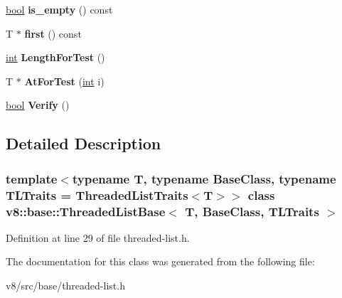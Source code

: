 \begin{DoxyCompactItemize}
\item 
\mbox{\label{classv8_1_1base_1_1ThreadedListBase_a6c606d3d8a227ebcbc9e2d6b9569ba20}} 
\mbox{\hyperlink{classbool}{bool}} {\bfseries is\+\_\+empty} () const
\item 
\mbox{\label{classv8_1_1base_1_1ThreadedListBase_ae4f82b13db3e8093aca9bd443ff356aa}} 
T $\ast$ {\bfseries first} () const
\item 
\mbox{\label{classv8_1_1base_1_1ThreadedListBase_a229874314d6b5fba9221a76d7674eb32}} 
\mbox{\hyperlink{classint}{int}} {\bfseries Length\+For\+Test} ()
\item 
\mbox{\label{classv8_1_1base_1_1ThreadedListBase_a74dac30c496ec00ee10e84f04d285d99}} 
T $\ast$ {\bfseries At\+For\+Test} (\mbox{\hyperlink{classint}{int}} i)
\item 
\mbox{\label{classv8_1_1base_1_1ThreadedListBase_af26a9f6f2a0472b8e8b55c123089ed77}} 
\mbox{\hyperlink{classbool}{bool}} {\bfseries Verify} ()
\end{DoxyCompactItemize}


\subsection{Detailed Description}
\subsubsection*{template$<$typename T, typename Base\+Class, typename T\+L\+Traits = Threaded\+List\+Traits$<$\+T$>$$>$\newline
class v8\+::base\+::\+Threaded\+List\+Base$<$ T, Base\+Class, T\+L\+Traits $>$}



Definition at line 29 of file threaded-\/list.\+h.



The documentation for this class was generated from the following file\+:\begin{DoxyCompactItemize}
\item 
v8/src/base/threaded-\/list.\+h\end{DoxyCompactItemize}
